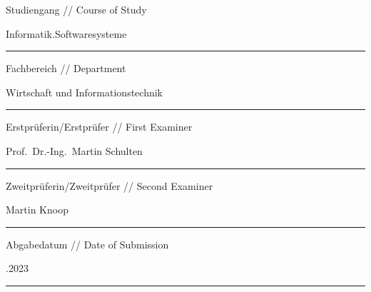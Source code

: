 \begin{titlepage}
        \vskip 0.13cm

        \begingroup
        \fontsize{8pt}{6pt}\selectfont
        Studiengang // Course of Study
        \endgroup

        \vskip 0.03cm

        \begingroup
        \fontsize{12pt}{14pt}\selectfont
        Informatik.Softwaresysteme
        \endgroup

        \vskip -0.05cm

        \noindent\rule{14cm}{0.4pt}

        \vskip 0.13cm

        \begingroup
        \fontsize{8pt}{6pt}\selectfont
        Fachbereich // Department
        \endgroup

        \vskip 0.03cm

        \begingroup
        \fontsize{12pt}{14pt}\selectfont
        Wirtschaft und Informationstechnik
        \endgroup

        \vskip -0.05cm

        \noindent\rule{14cm}{0.4pt}

        \vskip 0.13cm

        \begingroup
        \fontsize{8pt}{6pt}\selectfont
        Erstprüferin/Erstprüfer // First Examiner
        \endgroup

        \vskip 0.03cm

        \begingroup
        \fontsize{12pt}{14pt}\selectfont
        Prof.\ Dr.-Ing.\ Martin Schulten
        \endgroup

        \vskip -0.05cm

        \noindent\rule{14cm}{0.4pt}

        \vskip 0.13cm

        \begingroup
        \fontsize{8pt}{6pt}\selectfont
        Zweitprüferin/Zweitprüfer // Second Examiner
        \endgroup

        \vskip 0.03cm

        \begingroup
        \fontsize{12pt}{14pt}\selectfont
        Martin Knoop
        \endgroup

        \vskip -0.05cm

        \noindent\rule{14cm}{0.4pt}

        \vskip 0.13cm

        \begingroup
        \fontsize{8pt}{6pt}\selectfont
        Abgabedatum // Date of Submission
        \endgroup

        \vskip 0.03cm

        \begingroup
        \fontsize{12pt}{14pt}.2023
        \endgroup

        \vskip -0.05cm

        \noindent\rule{14cm}{0.4pt}
    \restoregeometry
\end{titlepage}
\clearpage
